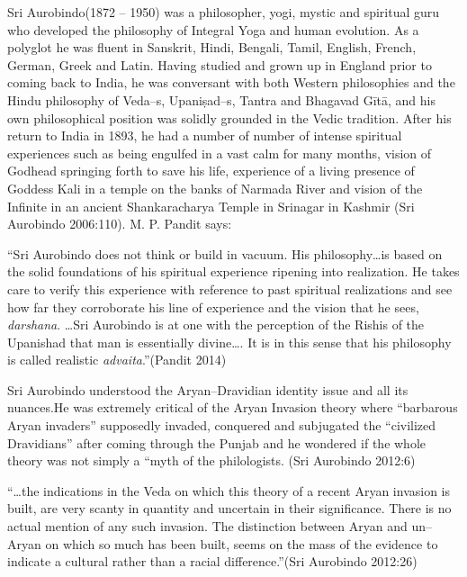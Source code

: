 Sri Aurobindo(1872 – 1950) was a philosopher, yogi, mystic and spiritual guru who developed the philosophy of Integral Yoga and human evolution. As a polyglot he was fluent in Sanskrit, Hindi, Bengali, Tamil, English, French, German, Greek and Latin. Having studied and grown up in England prior to coming back to India, he was conversant with both Western philosophies and the Hindu philosophy of Veda–s, Upaniṣad–s, Tantra and Bhagavad Gītā, and his own philosophical position was solidly grounded in the Vedic tradition. After his return to India in 1893, he had a number of number of intense spiritual experiences such as being engulfed in a vast calm for many months, vision of Godhead springing forth to save his life, experience of a living presence of Goddess Kali in a temple on the banks of Narmada River and vision of the Infinite in an ancient Shankaracharya Temple in Srinagar in Kashmir (Sri Aurobindo 2006:110). M. P. Pandit says:

\newpage

\begin{myquote}
“Sri Aurobindo does not think or build in vacuum. His philosophy…is based on the solid foundations of his spiritual experience ripening into realization. He takes care to verify this experience with reference to past spiritual realizations and see how far they corroborate his line of experience and the vision that he sees, \textit{darshana}. …Sri Aurobindo is at one with the perception of the Rishis of the Upanishad that man is essentially divine…. It is in this sense that his philosophy is called realistic \textit{advaita}.”(Pandit 2014)
\end{myquote}

Sri Aurobindo understood the Aryan–Dravidian identity issue and all its nuances.He was extremely critical of the Aryan Invasion theory where “barbarous Aryan invaders” supposedly invaded, conquered and subjugated the “civilized Dravidians” after coming through the Punjab and he wondered if the whole theory was not simply a “myth of the philologists. (Sri Aurobindo 2012:6)

\begin{myquote}
“…the indications in the Veda on which this theory of a recent Aryan invasion is built, are very scanty in quantity and uncertain in their significance. There is no actual mention of any such invasion. The distinction between Aryan and un–Aryan on which so much has been built, seems on the mass of the evidence to indicate a cultural rather than a racial difference.”(Sri Aurobindo 2012:26)
\end{myquote}

